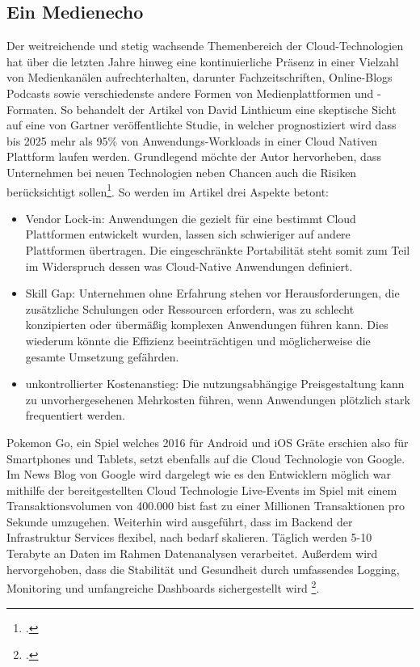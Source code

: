 \subsection{Ein Medienecho}\label{lab:medienecho}
Der weitreichende und stetig wachsende Themenbereich der Cloud-Technologien hat über die letzten Jahre hinweg eine kontinuierliche Präsenz in einer Vielzahl von Medienkanälen aufrechterhalten, darunter Fachzeitschriften, Online-Blogs Podcasts sowie verschiedenste andere Formen von Medienplattformen und -Formaten. So behandelt der Artikel von David Linthicum eine skeptische Sicht auf eine von Gartner veröffentlichte Studie, in welcher prognostiziert wird dass bis 2025 mehr als 95\% von Anwendungs-Workloads in einer Cloud Nativen Plattform laufen werden. Grundlegend möchte der Autor hervorheben, dass Unternehmen bei neuen Technologien neben Chancen auch die Risiken berücksichtigt sollen\footcite[Vgl.][o.S.]{compWoche}. So werden im Artikel drei Aspekte betont:
\begin{itemize}
	\item Vendor Lock-in: Anwendungen die gezielt für eine bestimmt Cloud Plattformen entwickelt wurden, lassen sich schwieriger auf andere Plattformen übertragen. Die eingeschränkte Portabilität steht somit zum Teil im Widerspruch dessen was Cloud-Native Anwendungen definiert.
	\item Skill Gap: Unternehmen ohne Erfahrung stehen vor Herausforderungen, die zusätzliche Schulungen oder Ressourcen erfordern, was zu schlecht konzipierten oder übermäßig komplexen Anwendungen führen kann. Dies wiederum könnte die Effizienz beeinträchtigen und möglicherweise die gesamte Umsetzung gefährden.
	\item unkontrollierter Kostenanstieg: Die nutzungsabhängige Preisgestaltung kann zu unvorhergesehenen Mehrkosten führen, wenn Anwendungen plötzlich stark frequentiert werden. 
\end{itemize}

Pokemon Go, ein Spiel welches 2016 für Android und iOS Gräte erschien also für Smartphones und Tablets, setzt ebenfalls auf die Cloud Technologie von Google. Im News Blog von Google wird dargelegt wie es den Entwicklern möglich war mithilfe der bereitgestellten Cloud Technologie Live-Events im Spiel mit einem Transaktionsvolumen von 400.000 bist fast zu einer Millionen Transaktionen pro Sekunde umzugehen. Weiterhin wird ausgeführt, dass im Backend der Infrastruktur  Services flexibel, nach bedarf skalieren. Täglich werden 5-10 Terabyte an Daten im Rahmen Datenanalysen verarbeitet. Außerdem wird hervorgehoben, dass die Stabilität und Gesundheit durch umfassendes Logging, Monitoring und umfangreiche Dashboards sichergestellt wird \footcite[Vgl.][o.S.]{pokemonGo}.
